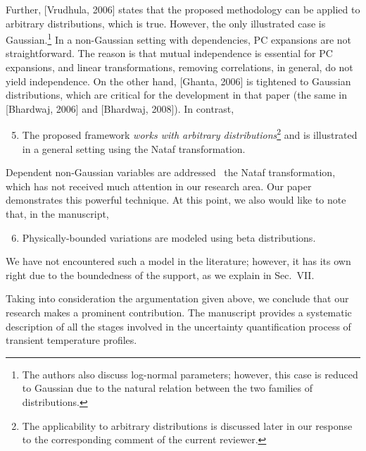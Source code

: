 \begin{authors}
Further, [Vrudhula, 2006] states that the proposed methodology can be applied to arbitrary distributions, which is true.
However, the only illustrated case is Gaussian.\footnote{The authors also discuss log-normal parameters; however, this case is reduced to Gaussian due to the natural relation between the two families of distributions.}
In a non-Gaussian setting with dependencies, PC expansions are not straightforward.
The reason is that mutual independence is essential for PC expansions, and linear transformations, removing correlations, in general, do not yield independence.
On the other hand, [Ghanta, 2006] is tightened to Gaussian distributions, which are critical for the development in that paper (the same in [Bhardwaj, 2006] and [Bhardwaj, 2008]).
In contrast,
\begin{enumerate}
  \setcounter{enumi}{4}
  \item The proposed framework \emph{works with arbitrary distributions}\footnote{The applicability to arbitrary distributions is discussed later in our response to the corresponding comment of the current reviewer.} and is illustrated in a general setting using the Nataf transformation.
\end{enumerate}
Dependent non-Gaussian variables are addressed \via\ the Nataf transformation, which has not received much attention in our research area.
Our paper demonstrates this powerful technique.
At this point, we also would like to note that, in the manuscript,
\begin{enumerate}
  \setcounter{enumi}{5}
  \item Physically-bounded variations are modeled using beta distributions.
\end{enumerate}
We have not encountered such a model in the literature; however, it has its own right due to the boundedness of the support, as we explain in Sec.~VII.

Taking into consideration the argumentation given above, we conclude that our research makes a prominent contribution.
The manuscript provides a systematic description of all the stages involved in the uncertainty quantification process of transient temperature profiles.

\begin{actions}
\end{actions}
\end{authors}

